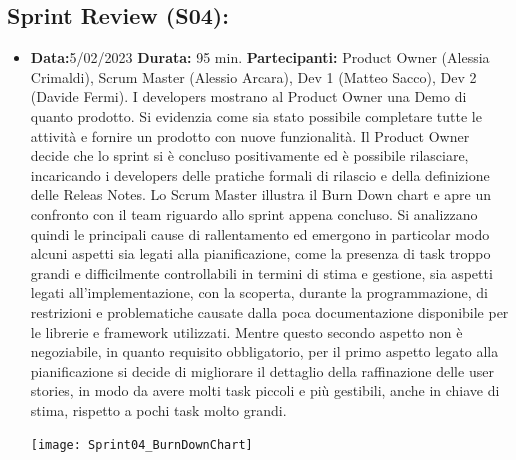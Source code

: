 \documentclass[a4paper, oneside]{article}
\newcommand\quattro{Scrum Master (Alessio Arcara), Dev 1 (Matteo Sacco), Dev 2 (Davide Fermi).}
\newcommand\quattroP{Product Owner (Alessia Crimaldi), }
\begin{document}
\begin{landscape}
        \newpage
        \normalsize
        \subsection{Sprint Review (S04):}
        \begin{itemize}
            \item \textbf{Data:}5/02/2023
            \newline \textbf{Durata:} 95 min.
            \newline \textbf{Partecipanti:} \quattroP \quattro
            \newline
            \newline I developers mostrano al Product Owner una Demo di quanto prodotto. Si evidenzia come sia stato possibile completare tutte le attività e fornire un prodotto con nuove funzionalità. Il Product Owner decide che lo sprint si è concluso positivamente ed è possibile rilasciare, incaricando i developers delle pratiche formali di rilascio e della definizione delle Releas Notes.
            \newline Lo Scrum Master illustra il Burn Down chart e apre un confronto con il team riguardo allo sprint appena concluso.
            Si analizzano quindi le principali cause di rallentamento ed emergono in particolar modo alcuni aspetti sia legati alla pianificazione, come la presenza di task troppo grandi e difficilmente controllabili in termini di stima e gestione, sia aspetti legati all'implementazione, con la scoperta, durante la programmazione, di restrizioni e problematiche causate dalla poca documentazione disponibile per le librerie e framework utilizzati. Mentre questo secondo aspetto non è negoziabile, in quanto requisito obbligatorio, per il primo aspetto legato alla pianificazione si decide di migliorare il dettaglio della raffinazione delle user stories, in modo da avere molti task piccoli e più gestibili, anche in chiave di stima, rispetto a pochi task molto grandi.

            \texttt{[image: Sprint04\_BurnDownChart]}

        \end{itemize}

        \newpage

\end{landscape}
\end{document}
